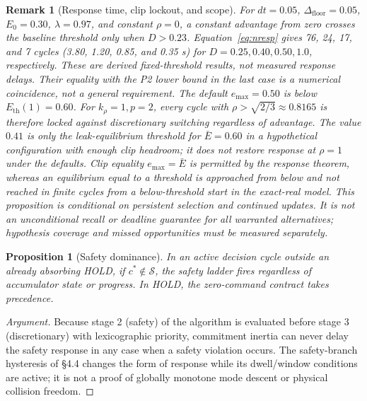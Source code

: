 \documentclass[11pt]{article}
\newtheorem{proposition}{Proposition}
\newtheorem{remark}{Remark}
\newcommand{\Dfloor}{\Delta_{\text{floor}}}
\newcommand{\Eth}{E_{\text{th}}}
\begin{document}
\begin{remark}[Response time, clip lockout, and scope] \label{rem:resptime}
For $dt=0.05$, $\Dfloor=0.05$, $E_0=0.30$, $\lambda=0.97$, and constant $\rho=0$, a constant advantage from zero crosses the baseline threshold only when $D>0.23$. Equation~\eqref{eq:nresp} gives 76, 24, 17, and 7 cycles (3.80, 1.20, 0.85, and 0.35 s) for $D=0.25,0.40,0.50,1.0$, respectively. These are derived fixed-threshold results, not measured response delays. Their equality with the P2 lower bound in the last case is a numerical coincidence, not a general requirement.
The default $e_{\max}=0.50$ is below $\Eth(1)=0.60$. For $k_\rho=1,p=2$, every cycle with $\rho>\sqrt{2/3}\approx0.8165$ is therefore locked against discretionary switching regardless of advantage. The value $0.41$ is only the leak-equilibrium threshold for $\bar E=0.60$ in a hypothetical configuration with enough clip headroom; it does not restore response at $\rho=1$ under the defaults. Clip equality $e_{\max}=\bar E$ is permitted by the response theorem, whereas an equilibrium equal to a threshold is approached from below and not reached in finite cycles from a below-threshold start in the exact-real model.
This proposition is conditional on persistent selection and continued updates. It is not an unconditional recall or deadline guarantee for all warranted alternatives; hypothesis coverage and missed opportunities must be measured separately.
\end{remark}

\begin{proposition}[Safety dominance] \label{prop:p3}
In an active decision cycle outside an already absorbing HOLD, if $c^*\notin\mathcal{S}$, the safety ladder fires regardless of accumulator state or progress. In HOLD, the zero-command contract takes precedence.
\end{proposition}

\begin{proof}[Argument]
Because stage 2 (safety) of the algorithm is evaluated before stage 3 (discretionary) with lexicographic priority, commitment inertia can never delay the safety response in any case when a safety violation occurs. The safety-branch hysteresis of \S4.4 changes the form of response while its dwell/window conditions are active; it is not a proof of globally monotone mode descent or physical collision freedom.
\end{proof}
\end{document}
